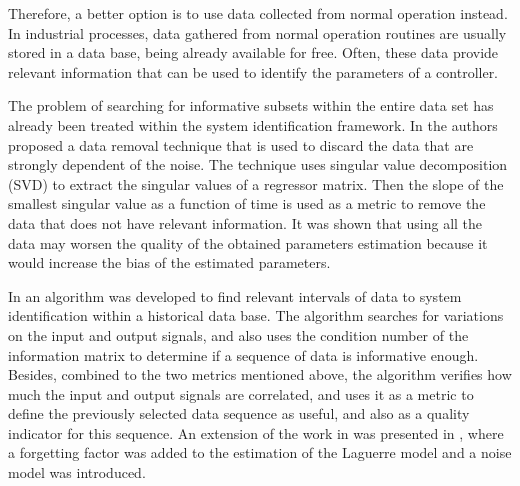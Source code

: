 \documentclass[letterpaper, 10 pt, conference]{ieeeconf}  %
\begin{document}
Therefore, a better option is to use data collected from normal operation instead.
In industrial processes, data gathered from normal operation routines are usually stored in a data base, being already available for free.
Often, these data provide relevant information that can be used to identify the parameters of a controller.

The problem of searching for informative subsets within the entire data set has already been treated within the system identification framework.
In \cite{carrette1996discarding} the authors proposed a data removal technique that is used to discard the data that are strongly dependent of the noise.
The technique uses singular value decomposition (SVD) to extract the singular values of a regressor matrix.
Then the slope of the smallest singular value as a function of time is used as a metric to remove the data that does not have relevant information.
It was shown that using all the data may worsen the quality of the obtained parameters estimation because it would increase the bias of the estimated parameters.

In \cite{peretzki2011data} an algorithm was developed to find relevant intervals of data to system identification within a historical data base.
The algorithm searches for variations on the input and output signals, and also uses the condition number of the information matrix to determine if a sequence of data is informative enough.
Besides, combined to the two metrics mentioned above, the algorithm verifies how much the input and output signals are correlated, and uses it as a metric to define the previously selected data sequence as useful, and also as a quality indicator for this sequence.
An extension of the work in \cite{peretzki2011data} was presented in \cite{bittencourt2015algorithm}, where a forgetting factor was added to the estimation of the Laguerre model and a noise model was introduced.
\end{document}
